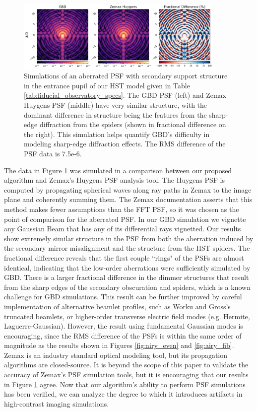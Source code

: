 \begin{figure}[H]
    \centering
    \includegraphics[width=0.9\textwidth]{hst_aberrated_psf.png}
    \caption{Simulations of an aberrated PSF with secondary support structure in the entrance pupil of our HST model given in Table \ref{tab:fiducial_observatory_specs}. The GBD PSF (left) and Zemax Huygens PSF (middle) have very similar structure, with the dominant difference in structure being the features from the sharp-edge diffraction from the spiders (shown in fractional difference on the right). This simulation helps quantify GBD's difficulty in modeling sharp-edge diffraction effects. The RMS difference of the PSF data is 7.5e-6.}
    \label{fig:aberrated}
\end{figure}

The data in Figure \ref{fig:aberrated} was simulated in a comparison between our proposed algorithm and Zemax's Huygens PSF analysis tool. The Huygens PSF is computed by propagating spherical waves along ray paths in Zemax to the image plane and coherently summing them. The Zemax documentation asserts that this method makes fewer assumptions than the FFT PSF, so it was chosen as the point of comparison for the aberrated PSF. In our GBD simulation we vignette any Gaussian Beam that has any of its differential rays vignetted. Our results show extremely similar structure in the PSF from both the aberration induced by the secondary mirror misalignment and the structure from the HST spiders. The fractional difference reveals that the first couple ``rings" of the PSFs are almost identical, indicating that the low-order aberrations were sufficiently simulated by GBD. There is a larger fractional difference in the dimmer structures that result from the sharp edges of the secondary obscuration and spiders, which is a known challenge for GBD simulations. This result can be further improved by careful implementation of alternative beamlet profiles, such as Worku and Gross's truncated beamlets\cite{Worku19}, or higher-order transverse electric field modes (e.g. Hermite, Laguerre-Gaussian). However, the result using fundamental Gaussian modes is encouraging, since the RMS difference of the PSFs is within the same order of magnitude as the results shown in Figures \ref{fig:airy_even} and \ref{fig:airy_fib}. Zemax is an industry standard optical modeling tool, but its propagation algorithms are closed-source. It is beyond the scope of this paper to validate the accuracy of Zemax's PSF simulation tools, but it is encouraging that our results in Figure \ref{fig:aberrated} agree. Now that our algorithm's ability to perform PSF simulations has been verified, we can analyze the degree to which it introduces artifacts in high-contrast imaging simulations.

